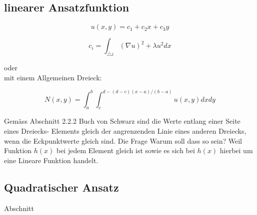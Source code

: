 \subsection{linearer Ansatzfunktion
\label{fem:subsection:bonorum}}

\begin{equation}
u(x,y) = c_1 + c_2x + c_3y
\label{fem:equation3}
\end{equation}

\begin{equation}
c_i= \int_{\triangle i} (\nabla u)^2 +\lambda u^2 dx
\label{fem:equation3}
\end{equation}

oder\\
mit einem Allgemeinen Dreieck:

\begin{equation}
N(x,y) = \int_a^b\int_c^{d-(d-c)(x-a)/(b-a)} u(x,y) dxdy
\label{fem:Dreieck_alg}
\end{equation}

Gemäss Abschnitt 2.2.2 Buch von Schwarz sind die Werte entlang einer Seite eines Dreiecks- Elements gleich  der angrenzenden Linie eines anderen Dreiecks, wenn die Eckpunktwerte gleich sind. Die Frage Warum soll dass so sein? Weil Funktion $h(x)$ bei jedem Element gleich ist sowie es sich bei $h(x)$ hierbei um eine Lineare Funktion handelt.

\subsection{Quadratischer Ansatz
\label{fem:subsection:bonorum}}
 Abschnitt 
